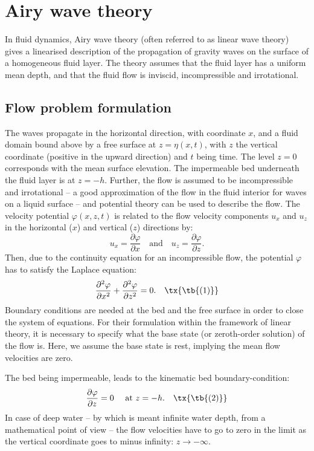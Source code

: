 \documentclass[a4paper,12pt]{report}
\begin{document}
\section{Airy wave theory}
In fluid dynamics, Airy wave theory (often referred to as linear wave theory) gives a linearised description of the propagation of gravity waves on the surface of a homogeneous fluid layer. The theory assumes that the fluid layer has a uniform mean depth, and that the fluid flow is inviscid, incompressible and irrotational.
\subsection{Flow problem formulation}
The waves propagate in the horizontal direction, with coordinate \( x \), and a fluid domain bound above by a free surface at \( z = \eta(x,t) \), with \( z \) the vertical coordinate (positive in the upward direction) and \( t \) being time. The level \( z = 0 \) corresponds with the mean surface elevation. The impermeable bed underneath the fluid layer is at \( z = -h \). Further, the flow is assumed to be incompressible and irrotational – a good approximation of the flow in the fluid interior for waves on a liquid surface – and potential theory can be used to describe the flow. The velocity potential \( \varphi(x, z, t) \) is related to the flow velocity components \( u_x \) and \( u_z \) in the horizontal (\( x \)) and vertical (\( z \)) directions by:
\[
u_x = \frac{\partial \varphi}{\partial x} \quad \text{and} \quad u_z = \frac{\partial \varphi}{\partial z}.
\]
Then, due to the continuity equation for an incompressible flow, the potential \( \varphi \) has to satisfy the Laplace equation:
\begin{equation}
\frac{\partial^2 \varphi}{\partial x^2} + \frac{\partial^2 \varphi}{\partial z^2} = 0.\quad\tx{\tb{(1)}}
\end{equation}
Boundary conditions are needed at the bed and the free surface in order to close the system of equations. For their formulation within the framework of linear theory, it is necessary to specify what the base state (or zeroth-order solution) of the flow is. Here, we assume the base state is rest, implying the mean flow velocities are zero.

The bed being impermeable, leads to the kinematic bed boundary-condition:
\begin{equation}
\frac{\partial \varphi}{\partial z} = 0 \quad \text{ at } z = -h.\quad\tx{\tb{(2)}}
\end{equation}
In case of deep water – by which is meant infinite water depth, from a mathematical point of view – the flow velocities have to go to zero in the limit as the vertical coordinate goes to minus infinity: \( z \to -\infty \).
\end{document}
